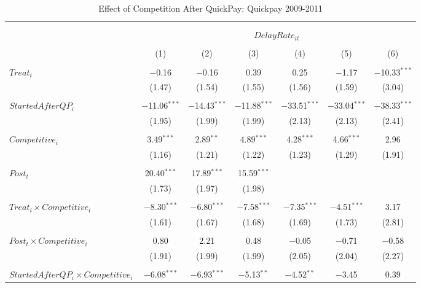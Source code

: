 \documentclass[]{article}
\begin{document}
\begin{table}[H] \centering 
  \caption{Effect of Competition After QuickPay: Quickpay 2009-2011} 
  \label{} 
\small 
\begin{tabular}{@{\extracolsep{-3pt}}lcccccc} 
\\[-1.8ex]\hline 
\hline \\[-1.8ex] 
\\[-1.8ex] & \multicolumn{6}{c}{$DelayRate_{it}$  } \\ 
\\[-1.8ex] & (1) & (2) & (3) & (4) & (5) & (6)\\ 
\hline \\[-1.8ex] 
 $Treat_i$ & $-$0.16 & $-$0.16 & 0.39 & 0.25 & $-$1.17 & $-$10.33$^{***}$ \\ 
  & (1.47) & (1.54) & (1.55) & (1.56) & (1.59) & (3.04) \\ 
  & & & & & & \\ 
 $StartedAfterQP_i$ & $-$11.06$^{***}$ & $-$14.43$^{***}$ & $-$11.88$^{***}$ & $-$33.51$^{***}$ & $-$33.04$^{***}$ & $-$38.33$^{***}$ \\ 
  & (1.95) & (1.99) & (1.99) & (2.13) & (2.13) & (2.41) \\ 
  & & & & & & \\ 
 $Competitive_i$ & 3.49$^{***}$ & 2.89$^{**}$ & 4.89$^{***}$ & 4.28$^{***}$ & 4.66$^{***}$ & 2.96 \\ 
  & (1.16) & (1.21) & (1.22) & (1.23) & (1.29) & (1.91) \\ 
  & & & & & & \\ 
 $Post_t$ & 20.40$^{***}$ & 17.89$^{***}$ & 15.59$^{***}$ &  &  &  \\ 
  & (1.73) & (1.97) & (1.98) &  &  &  \\ 
  & & & & & & \\ 
 $Treat_i \times Competitive_i$ & $-$8.30$^{***}$ & $-$6.80$^{***}$ & $-$7.58$^{***}$ & $-$7.35$^{***}$ & $-$4.51$^{***}$ & 3.17 \\ 
  & (1.61) & (1.67) & (1.68) & (1.69) & (1.73) & (2.81) \\ 
  & & & & & & \\ 
 $Post_t \times Competitive_i$ & 0.80 & 2.21 & 0.48 & $-$0.05 & $-$0.71 & $-$0.58 \\ 
  & (1.91) & (1.99) & (1.99) & (2.05) & (2.04) & (2.27) \\ 
  & & & & & & \\ 
 $StartedAfterQP_i \times Competitive_i$ & $-$6.08$^{***}$ & $-$6.93$^{***}$ & $-$5.13$^{**}$ & $-$4.52$^{**}$ & $-$3.45 & 0.39 \\ 

\end{tabular}
\end{table}
\end{document}
